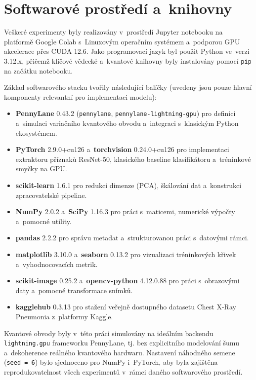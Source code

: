 \documentclass[12pt, a4paper]{report}
\begin{document}
\section{Softwarové prostředí a~knihovny}

Veškeré experimenty byly realizovány v~prostředí Jupyter notebooku na platformě Google Colab s~Linuxovým operačním systémem a~podporou GPU akcelerace přes CUDA 12.6. Jako programovací jazyk byl použit Python ve~verzi 3.12.x, přičemž klíčové vědecké a~kvantové knihovny byly instalovány pomocí \texttt{pip} na začátku notebooku.

Základ softwarového stacku tvořily následující balíčky (uvedeny jsou pouze hlavní komponenty relevantní pro implementaci modelu):

\begin{itemize}
    \item \textbf{PennyLane} 0.43.2 (\texttt{pennylane}, \texttt{pennylane-lightning-gpu}) pro definici a~simulaci variačního kvantového obvodu a~integraci s~klasickým Python ekosystémem.
    \item \textbf{PyTorch} 2.9.0+cu126 a~\textbf{torchvision} 0.24.0+cu126 pro implementaci extraktoru příznaků ResNet-50, klasického baseline klasifikátoru a~tréninkové smyčky na GPU.
    \item \textbf{scikit-learn} 1.6.1 pro redukci dimenze (PCA), škálování dat a~konstrukci zpracovatelské pipeline.
    \item \textbf{NumPy} 2.0.2 a~\textbf{SciPy} 1.16.3 pro práci s~maticemi, numerické výpočty a~pomocné utility.
    \item \textbf{pandas} 2.2.2 pro správu metadat a~strukturovanou práci s~datovými rámci.
    \item \textbf{matplotlib} 3.10.0 a~\textbf{seaborn} 0.13.2 pro vizualizaci tréninkových křivek a~vyhodnocovacích metrik.
    \item \textbf{scikit-image} 0.25.2 a~\textbf{opencv-python} 4.12.0.88 pro práci s~obrazovými daty a~pomocné transformace snímků.
    \item \textbf{kagglehub} 0.3.13 pro stažení veřejně dostupného datasetu Chest X-Ray Pneumonia z~platformy Kaggle.
\end{itemize}

Kvantové obvody byly v~této práci simulovány na ideálním backendu \texttt{lightning.gpu} frameworku PennyLane, tj. bez explicitního modelování šumu a~dekoherence reálného kvantového hardwaru. Nastavení náhodného semene (\texttt{seed = 6}) bylo sjednoceno pro NumPy i~PyTorch, aby byla zajištěna reprodukovatelnost všech experimentů v~rámci daného softwarového prostředí.
\end{document}
